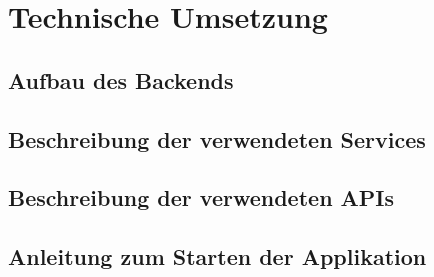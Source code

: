\chapter{Technische Umsetzung}
\section{Aufbau des Backends}
\section{Beschreibung der verwendeten Services}
\section{Beschreibung der verwendeten APIs}
\section{Anleitung zum Starten der Applikation}
